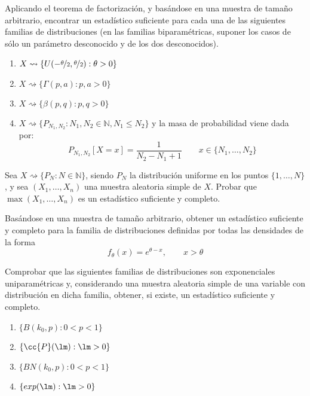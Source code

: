 \begin{ejercicio}
    Aplicando el teorema de factorización, y basándose en una muestra de tamaño arbitrario, encontrar un estadístico suficiente para cada una de las siguientes familias de distribuciones (en las familias biparamétricas, suponer los casos de sólo un parámetro desconocido y de los dos desconocidos).
    \begin{enumerate}[label=\alph*)]
        \item $X\rightsquigarrow\{U(-\nicefrac{\theta}{2},\nicefrac{\theta}{2}) : \theta>0\}$
        \item $X\rightsquigarrow\{\Gamma(p,a) : p,a > 0\}$
        \item $X\rightsquigarrow\{\beta(p,q) : p,q>0\}$
        \item $X\rightsquigarrow\{P_{N_1,N_2} : N_1, N_2 \in \mathbb{N}, N_1 \leq N_2\}$ y la masa de probabilidad viene dada por:
            \begin{equation*}
                P_{N_1, N_2}[X=x] = \dfrac{1}{N_2 - N_1 + 1} \qquad x\in \{N_1, \ldots, N_2\}
            \end{equation*}
    \end{enumerate}
\end{ejercicio}

\begin{ejercicio}
    Sea $X\rightsquigarrow\{P_N : N\in \mathbb{N}\}$, siendo $P_N$ la distribución uniforme en los puntos $\{1,\ldots,N\}$, y sea $(X_1, \ldots, X_n)$ una muestra aleatoria simple de $X$. Probar que $\max(X_1, \ldots, X_n)$ es un estadístico suficiente y completo.
\end{ejercicio}

\begin{ejercicio}
    Basándose en una muestra de tamaño arbitrario, obtener un estadístico suficiente y completo para la familia de distribuciones definidas por todas las densidades de la forma
    \begin{equation*}
        f_\theta(x) = e^{\theta-x}, \qquad x>\theta
    \end{equation*}
\end{ejercicio}

\begin{ejercicio}
    Comprobar que las siguientes familias de distribuciones son exponenciales uniparamétricas y, considerando una muestra aleatoria simple de una variable con distribución en dicha familia, obtener, si existe, un estadístico suficiente y completo.
    \begin{enumerate}[label=\alph*)]
        \item $\{B(k_0,p) : 0<p<1\}$
        \item $\{\cc{P}(\lm) : \lm>0\}$
        \item $\{BN(k_0,p) : 0<p<1\}$
        \item $\{exp(\lm) : \lm>0\}$
    \end{enumerate}
\end{ejercicio}

